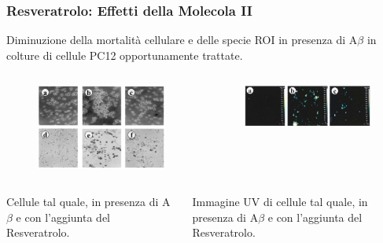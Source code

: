 \documentclass[9pt]{beamer}
\begin{document}
\begin{frame}
	\frametitle{Resveratrolo: Effetti della Molecola II}

	Diminuzione della mortalità cellulare e delle specie ROI in presenza di A$\beta$ in colture di cellule PC12 opportunamente trattate.
	\begin{columns}
		\begin{column}{0.5\textwidth}
			\begin{figure}
				\includegraphics[width=\textwidth]{immagini/apo_resveratrolo.png}
			\end{figure}
		\end{column}
		\begin{column}{0.5\textwidth}
			\begin{figure}
				\includegraphics[width=\textwidth]{immagini/roi_resveratrolo.png}
			\end{figure}
		\end{column}
	\end{columns}
	\medskip
	\begin{columns}
		\begin{column}{0.5\textwidth}
			Cellule tal quale, in presenza di A$\beta$ e con l'aggiunta del Resveratrolo.
		\end{column}
		\begin{column}{0.5\textwidth}
			Immagine UV di cellule tal quale, in presenza di A$\beta$ e con l'aggiunta del Resveratrolo.
		\end{column}
	\end{columns}

\end{frame}
\end{document}
